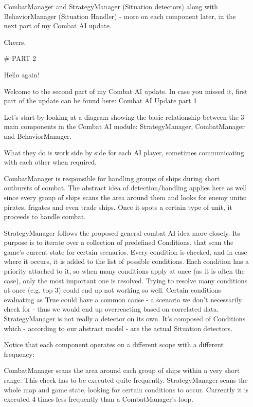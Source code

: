 CombatManager and StrategyManager (Situation detectors) along with BehaviorManager (Situation Handler) - more on each component later, in the next part of my Combat AI update.

Cheers.

# PART 2



Hello again!

Welcome to the second part of my Combat AI update. In case you missed it, first part of the update can be found here: Combat AI Update part 1

Let's start by looking at a diagram showing the basic relationship between the 3 main components in the Combat AI module: StrategyManager, CombatManager and BehaviorManager.

What they do is work side by side for each AI player, sometimes communicating with each other when required.

CombatManager is responsible for handling groups of ships during short outbursts of combat. The abstract idea of detection/handling applies here as well since every group of ships scans the area around them and looks for enemy units: pirates, frigates and even trade ships. Once it spots a certain type of unit, it proceeds to handle combat.

StrategyManager follows the proposed general combat AI idea more closely. Its purpose is to iterate over a collection of predefined Conditions, that scan the game's current state for certain scenarios.
Every condition is checked, and in case where it occurs, it is added to the list of possible conditions.
Each condition has a priority attached to it, so when many conditions apply at once (as it is often the case), only the most important one is resolved.
Trying to resolve many conditions at once (e.g. top 3) could end up not working so well.
Certain conditions evaluating as True could have a common cause - a scenario we don't necessarily check for - thus we would end up overreacting based on correlated data.
StrategyManager is not really a detector on its own.
It's composed of Conditions which - according to our abstract model - are the actual Situation detectors.

Notice that each component operates on a different scope with a different frequency:

    CombatManager scans the area around each group of ships within a very short range. This check has to be executed quite frequently.
    StrategyManager scans the whole map and game state, looking for certain conditions to occur.
	Currently it is executed 4 times less frequently than a CombatManager's loop.

